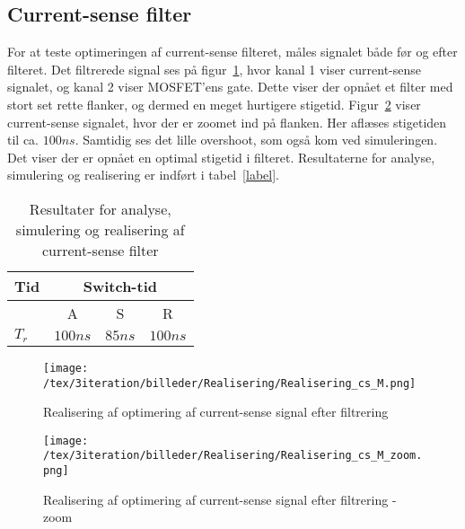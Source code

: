 
\subsection{Current-sense filter}
For at teste optimeringen af current-sense filteret, måles signalet både før og efter filteret. Det filtrerede signal ses på figur~\ref{fig:Realisering_cs_M_3}, hvor kanal 1 viser current-sense signalet, og kanal 2 viser MOSFET'ens gate. Dette viser der opnået et filter med stort set rette flanker, og dermed en meget hurtigere stigetid. Figur~\ref{fig:Realisering_cs_M_zoom_3} viser current-sense signalet, hvor der er zoomet ind på flanken. Her aflæses stigetiden til ca. $100ns$. Samtidig ses det lille overshoot, som også kom ved simuleringen. Det viser der er opnået en optimal stigetid i filteret. Resultaterne for analyse, simulering og realisering er indført i tabel~\ref{label}.

\begin{table}[H] 			
	\centering
	\begin{tabularx}{\textwidth}{|X|c|c|c|}
		\hline
		\textbf{Tid} & \multicolumn{3}{|c|}{\textbf{Switch-tid}} 										\\ \hline
		& A & S & R 									\\ \hline
		$T_{r}$ & $100ns$ & $85ns$ & $100ns$ 										\\ \hline 
	\end{tabularx}
	\caption{Resultater for analyse, simulering og realisering af current-sense filter}
	\label{tab:resultat_cs_filter_3}
\end{table}


\begin{figure}[H]
	\center
	\texttt{[image: /tex/3iteration/billeder/Realisering/Realisering\_cs\_M.png]}
	\caption{Realisering af optimering af current-sense signal efter filtrering}
	\label{fig:Realisering_cs_M_3}
\end{figure}

\begin{figure}[H]
	\center
	\texttt{[image: /tex/3iteration/billeder/Realisering/Realisering\_cs\_M\_zoom.png]}
	\caption{Realisering af optimering af current-sense signal efter filtrering - zoom}
	\label{fig:Realisering_cs_M_zoom_3}
\end{figure}